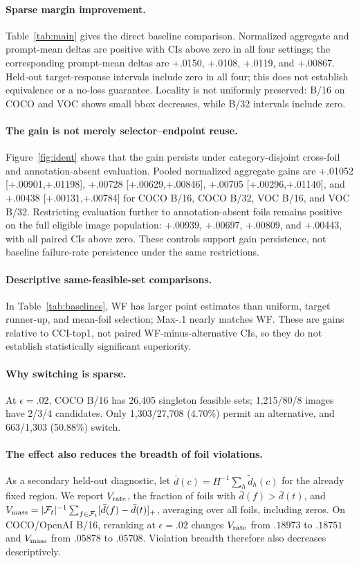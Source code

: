 \documentclass[10pt]{article}
\newcommand{\foils}{\mathcal{F}}
\begin{document}
\paragraph{Sparse margin improvement.}
Table~\ref{tab:main} gives the direct baseline comparison. Normalized aggregate
and prompt-mean deltas are positive with CIs above zero in all four settings;
the corresponding prompt-mean deltas are +.0150, +.0108, +.0119, and +.00867.
Held-out target-response intervals include zero in all four; this does not
establish equivalence or a no-loss guarantee. Locality is not
uniformly preserved: B/16 on COCO and VOC shows small bbox decreases, while B/32
intervals include zero.

\paragraph{The gain is not merely selector--endpoint reuse.}
Figure~\ref{fig:ident} shows that the gain persists under category-disjoint
cross-foil and annotation-absent evaluation. Pooled normalized aggregate gains
are +.01052 [+.00901,+.01198], +.00728 [+.00629,+.00846], +.00705
[+.00296,+.01140], and +.00438 [+.00131,+.00784] for COCO B/16, COCO B/32,
VOC B/16, and VOC B/32. Restricting evaluation further to annotation-absent
foils remains positive on the full eligible image population: +.00939, +.00697,
+.00809, and +.00443, with all paired CIs above zero. These controls support
gain persistence, not baseline failure-rate persistence under the same restrictions.

\paragraph{Descriptive same-feasible-set comparisons.}
In Table~\ref{tab:baselines}, WF has larger point estimates than uniform,
target runner-up, and mean-foil selection; Max-.1 nearly matches WF.
These are gains relative to CCI-top1, not paired WF-minus-alternative CIs,
so they do not establish statistically significant superiority.

\paragraph{Why switching is sparse.}
At $\epsilon=.02$, COCO B/16 has 26,405 singleton feasible sets;
1,215/80/8 images have 2/3/4 candidates. Only 1,303/27,708 (4.70\%)
permit an alternative, and 663/1,303 (50.88\%) switch.

\paragraph{The effect also reduces the breadth of foil violations.}
As a secondary held-out diagnostic, let
$\bar d(c)=H^{-1}\sum_h\tilde d_h(c)$ for the already fixed region.
We report $V_{\rm rate}$, the fraction of foils with $\bar d(f)>\bar d(t)$,
and $V_{\rm mass}=|\foils_t|^{-1}\sum_{f\in\foils_t}[\bar d(f)-\bar d(t)]_+$,
averaging over all foils, including zeros.
On COCO/OpenAI B/16, reranking at $\epsilon=.02$ changes $V_{\rm rate}$ from
$.18973$ to $.18751$ and $V_{\rm mass}$ from $.05878$ to $.05708$.
Violation breadth therefore also decreases descriptively.
\end{document}
